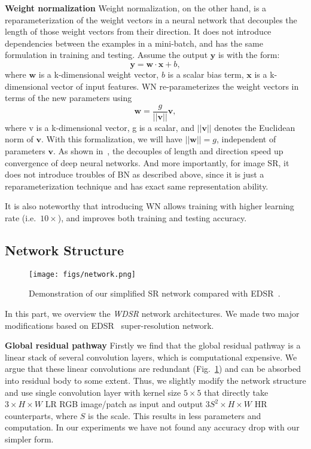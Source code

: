 \documentclass{article}
\begin{document}
\textbf{Weight normalization} Weight normalization, on the other hand, is a reparameterization of the weight vectors in a neural network that decouples the length of those weight vectors from their direction. It does not introduce dependencies between the examples in a mini-batch, and has the same formulation in training and testing. Assume the output \(\mathbf{y}\) is with the form:
\begin{equation}
\mathbf{y} = \mathbf{w} \cdot \mathbf{x} + b, 
\end{equation}
where \(\mathbf{w}\) is a k-dimensional weight vector, \(b\) is a scalar bias term, \(\mathbf{x}\) is a k-dimensional vector of input features. WN re-parameterizes the weight vectors in terms of the new parameters using
\begin{equation}
\mathbf{w} = \frac{g}{||\mathbf{v}||} \mathbf{v}, 
\end{equation}
where v is a k-dimensional vector, g is a scalar, and \(||\mathbf{v}||\) denotes the Euclidean norm of \(\mathbf{v}\). With this formalization, we will have \(||\mathbf{w}|| = g\), independent of parameters \(\mathbf{v}\). As shown in~\cite{salimans2016weight}, the decouples of length and direction speed up convergence of deep neural networks. And more importantly, for image SR, it does not introduce troubles of BN as described above, since it is just a reparameterization technique and has exact same representation ability.

It is also noteworthy that introducing WN allows training with higher learning rate (i.e.\ \(10 \times\)), and improves both training and testing accuracy.


\subsection{Network Structure}

\begin{figure}[h]
\centering
\texttt{[image: figs/network.png]}
\caption{Demonstration of our simplified SR network compared with EDSR~\cite{lim2017enhanced}.}
\label{fig:network}
\end{figure}

In this part, we overview the \textit{WDSR} network architectures. We made two major modifications based on EDSR~\cite{lim2017enhanced} super-resolution network.

\textbf{Global residual pathway} Firstly we find that the global residual pathway is a linear stack of several convolution layers, which is computational expensive. We argue that these linear convolutions are redundant (Fig.~\ref{fig:network}) and can be absorbed into residual body to some extent. Thus, we slightly modify the network structure and use single convolution layer with kernel size \(5 \times 5\) that directly take \(3 \times H \times W\) LR RGB image/patch as input and output \(3S^2 \times H \times W\) HR counterparts, where \(S\) is the scale. This results in less parameters and computation. In our experiments we have not found any accuracy drop with our simpler form.
\end{document}
